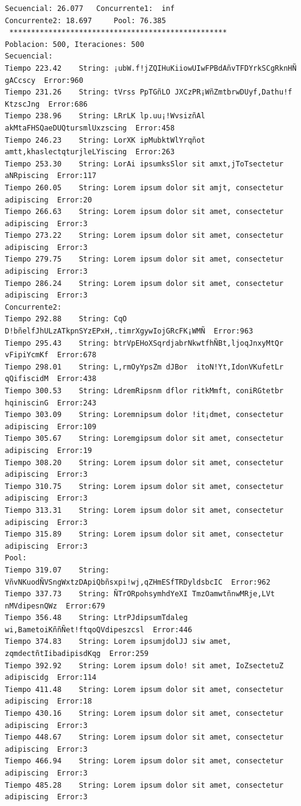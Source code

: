 \documentclass[a4paper,twocolumn,10pt]{article}
\begin{document}
\begin{center}
{\begin{verbatim}
Secuencial: 26.077	 Concurrente1:  inf
Concurrente2: 18.697	 Pool: 76.385 
 **************************************************
Poblacion: 500, Iteraciones: 500
Secuencial:
Tiempo 223.42	 String: ¡ubW.f!jZQIHuKiiowUIwFPBdAñvTFDYrkSCgRknHÑ gACcscy	 Error:960
Tiempo 231.26	 String: tVrss PpTGñLO JXCzPR¡WñZmtbrwDUyf,Dathu!f KtzscJng	 Error:686
Tiempo 238.96	 String: LRrLK lp.uu¡!WvsizñAl akMtaFHSQaeDUQtursmlUxzscing	 Error:458
Tiempo 246.23	 String: LorXK ipMubktWlYrqñot amtt,khaslectqturjleLYiscing	 Error:263
Tiempo 253.30	 String: LorAi ipsumksSlor sit amxt,jToTsectetur aNRpiscing	 Error:117
Tiempo 260.05	 String: Lorem ipsum dolor sit amjt, consectetur adipiscing	 Error:20
Tiempo 266.63	 String: Lorem ipsum dolor sit amet, consectetur adipiscing	 Error:3
Tiempo 273.22	 String: Lorem ipsum dolor sit amet, consectetur adipiscing	 Error:3
Tiempo 279.75	 String: Lorem ipsum dolor sit amet, consectetur adipiscing	 Error:3
Tiempo 286.24	 String: Lorem ipsum dolor sit amet, consectetur adipiscing	 Error:3
Concurrente2:
Tiempo 292.88	 String: CqO D!bñelfJhULzATkpnSYzEPxH,.timrXgywIojGRcFK¡WMÑ	 Error:963
Tiempo 295.43	 String: btrVpEHoXSqrdjabrNkwtfhÑBt,ljoqJnxyMtQr vFipiYcmKf	 Error:678
Tiempo 298.01	 String: L,rmOyYpsZm dJBor  itoN!Yt,IdonVKufetLr qQifiscidM	 Error:438
Tiempo 300.53	 String: LdremRipsnm dflor ritkMmft, coniRGtetbr hqiniscinG	 Error:243
Tiempo 303.09	 String: Loremnipsum dolor !it¡dmet, consectetur adipiscing	 Error:109
Tiempo 305.67	 String: Loremgipsum dolor sit amet, consectetur adipiscing	 Error:19
Tiempo 308.20	 String: Lorem ipsum dolor sit amet, consectetur adipiscing	 Error:3
Tiempo 310.75	 String: Lorem ipsum dolor sit amet, consectetur adipiscing	 Error:3
Tiempo 313.31	 String: Lorem ipsum dolor sit amet, consectetur adipiscing	 Error:3
Tiempo 315.89	 String: Lorem ipsum dolor sit amet, consectetur adipiscing	 Error:3
Pool:
Tiempo 319.07	 String: VñvNKuodÑVSngWxtzDApiQbñsxpi!wj,qZHmESfTRDyldsbcIC	 Error:962
Tiempo 337.73	 String: ÑTrORpohsymhdYeXI TmzOamwtñnwMRje,LVt nMVdipesnQWz	 Error:679
Tiempo 356.48	 String: LtrPJdipsumTdaleg wi,BametoiKññÑet!ftqoQVdipeszcsl	 Error:446
Tiempo 374.83	 String: Lorem ipsumjdolJJ siw amet, zqmdectñtIibadipisdKqg	 Error:259
Tiempo 392.92	 String: Lorem ipsum dolo! sit amet, IoZsectetuZ adipiscidg	 Error:114
Tiempo 411.48	 String: Lorem ipsum dolor sit amet, consectetur adipiscing	 Error:18
Tiempo 430.16	 String: Lorem ipsum dolor sit amet, consectetur adipiscing	 Error:3
Tiempo 448.67	 String: Lorem ipsum dolor sit amet, consectetur adipiscing	 Error:3
Tiempo 466.94	 String: Lorem ipsum dolor sit amet, consectetur adipiscing	 Error:3
Tiempo 485.28	 String: Lorem ipsum dolor sit amet, consectetur adipiscing	 Error:3


\end{verbatim}}
\end{center}
\end{document}

